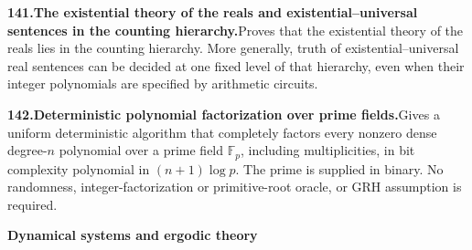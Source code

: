 \documentclass[11pt,a4paper]{article}
\begin{document}
  \par \begin{minipage}{\linewidth}
  \fontsize{10.5}{12.6}\selectfont\RaggedRight
  \hypertarget{result 141}{}
  {\bfseries\textcolor{muted}{141.}\enspace The existential theory of the reals and existential--universal sentences in the counting hierarchy.}\enspace Proves that the existential theory of the reals lies in the counting hierarchy. More generally, truth of existential--universal real sentences can be decided at one fixed level of that hierarchy, even when their integer polynomials are specified by arithmetic circuits.\par
  \end{minipage}\par\vspace{5pt}



  \par \begin{minipage}{\linewidth}
  \fontsize{10.5}{12.6}\selectfont\RaggedRight
  \hypertarget{result 142}{}
  {\bfseries\textcolor{muted}{142.}\enspace Deterministic polynomial factorization over prime fields.}\enspace Gives a uniform deterministic algorithm that completely factors every nonzero dense degree-$n$ polynomial over a prime field $\mathbb F_p$, including multiplicities, in bit complexity polynomial in $(n+1)\log p$. The prime is supplied in binary. No randomness, integer-factorization or primitive-root oracle, or GRH assumption is required.\par
  \end{minipage}\par\vspace{5pt}



  \par{}\addvspace{12pt}
  \hypertarget{subject 12}{}\label{subject 12}
  {\fontsize{15}{18}\selectfont\bfseries Dynamical systems and ergodic theory\par}
  \nobreak\vspace{9pt}\nobreak
\end{document}
